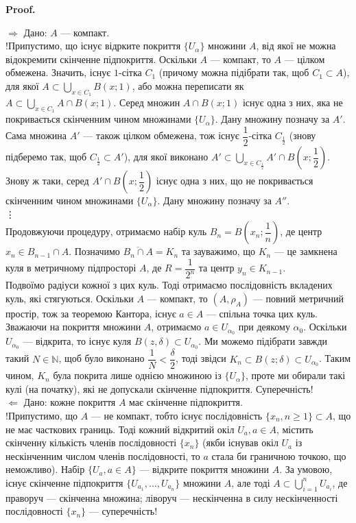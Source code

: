 \documentclass[a4paper, 10pt]{article}
\makeatletter
\def\rightproof{$\boxed{\Rightarrow}$ }
\def\leftproof{$\boxed{\Leftarrow}$ }
\theoremstyle{theoremdd}
\theoremstyle{theoremdd}
\theoremstyle{theoremdd}
\theoremstyle{theoremdd}
\theoremstyle{theoremdd}
\theoremstyle{theoremdd}
\theoremstyle{theoremdd}
\theoremstyle{theoremdd}
\renewenvironment{proof}[1][Proof.\\]{\par
\pushQED{\hfill \qed}%
\normalfont \topsep6\p@\@plus6\p@\relax
\trivlist
\item\relax
{\bfseries
#1\@addpunct{.}}\hspace\labelsep\ignorespaces
}{%
\popQED\endtrivlist\@endpefalse
}
\makeatother
\begin{document}
\begin{proof}
\rightproof Дано: $A$ --- компакт.\\
!Припустимо, що існує відрките покриття $\{U_\alpha\}$ множини $A$, від якої не можна відокремити скінченне підпокриття. Оскільки $A$ --- компакт, то $A$ --- цілком обмежена. Значить, існує $1$-сітка $C_1$ (причому можна підібрати так, щоб $C_1 \subset A$), для якої $A \subset \displaystyle\bigcup_{x \in C_1} B(x;1)$, або можна переписати як $A \subset \displaystyle\bigcup_{x \in C_1} A \cap B(x;1)$. Серед множин $A \cap B(x;1)$ існує одна з них, яка не покривається скінченним чином множинами $\{U_\alpha\}$. Дану множину позначу за $A'$.\\
Сама множина $A'$ --- також цілком обмежена, тож існує $\dfrac{1}{2}$-сітка $C_{\frac{1}{2}}$ (знову підберемо так, щоб $C_{\frac{1}{2}} \subset A'$), для якої виконано $A' \subset \displaystyle\bigcup_{x \in C_{\frac{1}{2}}} A' \cap B\left(x; \dfrac{1}{2}\right)$. Знову ж таки, серед $A' \cap B\left(x; \dfrac{1}{2}\right)$ існує одна з них, що не покривається скінченним чином множинами $\{U_\alpha\}$. Дану множину позначу за $A''$. \\
\vdots \\
Продовжуючи процедуру, отримаємо набір куль $B_n = B\left(x_n;\dfrac{1}{n}\right)$, де центр $x_n \in B_{n-1} \cap A$. Позначимо $\overline{B_n \cap A} = K_n$ та зауважимо, що $K_n$ --- це замкнена куля в метричному підпросторі $A$, де $R = \dfrac{1}{2^n}$ та центр $y_n \in K_{n-1}$.\\
Подвоїмо радіуси кожної з цих куль. Тоді отримаємо послідовність вкладених куль, які стягуються. Оскільки $A$ --- компакт, то $(A,\rho_A)$ --- повний метричний простір, тож за теоремою Кантора, існує $a \in A$ --- спільна точка цих куль. Зважаючи на покриття множини $A$, отримаємо $a \in U_{\alpha_0}$ при деякому $\alpha_0$. Оскільки $U_{\alpha_0}$ --- відкрита, то існує куля $B(z,\delta) \subset U_{\alpha_0}$. Ми можемо підібрати завжди такий $N \in \mathbb{N}$, щоб було виконано $\dfrac{1}{N} < \dfrac{\delta}{2}$, тоді звідси $K_n \subset B(z;\delta) \subset U_{\alpha_0}$. Таким чином, $K_n$ була покрита лише однією множиною із $\{U_\alpha\}$, проте ми обирали такі кулі (на початку), які не допускали скінченне підпокриття. Суперечність!
\bigskip \\
\leftproof Дано: кожне покриття $A$ має скінченне підпокриття.\\
!Припустимо, що $A$ --- не компакт, тобто існує послідовність $\{x_n, n \geq 1\} \subset A$, що не має часткових границь. Тоді кожний відкритий окіл $U_a, a \in A$, містить скінченну кількість членів послідовності $\{x_n\}$ (якби існував окіл $U_a$ із нескінченним числом членів послідовності, то $a$ стала би граничною точкою, що неможливо). Набір $\{U_a, a \in A\}$ --- відкрите покриття множини $A$. За умовою, існує скінченне підпокриття $\{U_{a_1},\dots,U_{a_n}\}$ множини $A$, але тоді $A \subset \displaystyle\bigcup_{i=1}^n U_{a_i}$, де праворуч --- скінченна множина; ліворуч --- нескінченна в силу нескінченності послідовності $\{x_n\}$ --- суперечність!
\end{proof}
\end{document}
